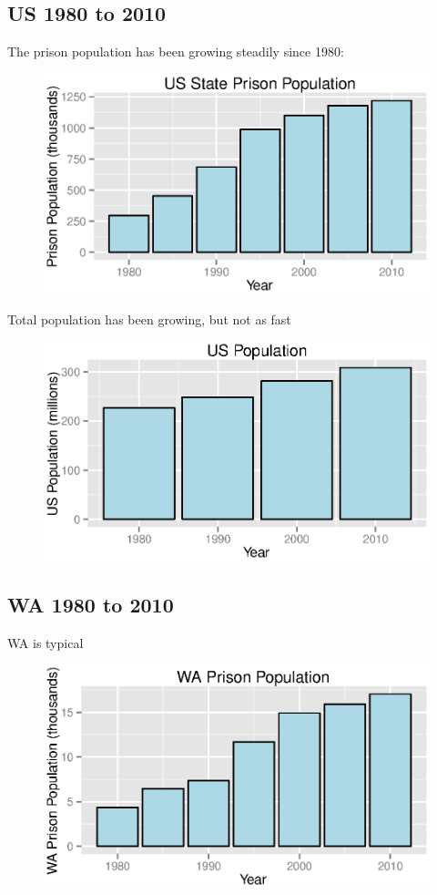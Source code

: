 \documentclass{exam}
\begin{document}
  \subsection{US 1980 to 2010}
  The prison population has been growing steadily since 1980:
  \begin{figure}[H]
    \centering
    \includegraphics[scale = 0.9]{us_prison_population.eps}
  \end{figure}

  Total population has been growing, but not as fast
  \begin{figure}[H]
    \centering
    \includegraphics[scale = 0.9]{us_population.eps}
  \end{figure}

  \subsection{WA 1980 to 2010}
  WA is typical
  \begin{figure}[H]
    \centering
    \includegraphics[scale = 0.9]{wa_prison_population.eps}
  \end{figure}
\end{document}
